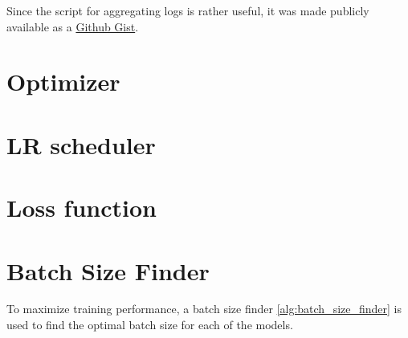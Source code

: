 Since the script for aggregating logs is rather useful, it was made publicly available as a \href{https://gist.github.com/SubhadityaMukherjee/58cbdf324812175233e91993b720e0bc}{Github Gist}.

\section{Optimizer}
\section{LR scheduler}
\section{Loss function}
\section{Batch Size Finder}
To maximize training performance, a batch size finder \ref{alg:batch_size_finder} is used to find the optimal batch size for each of the models.

